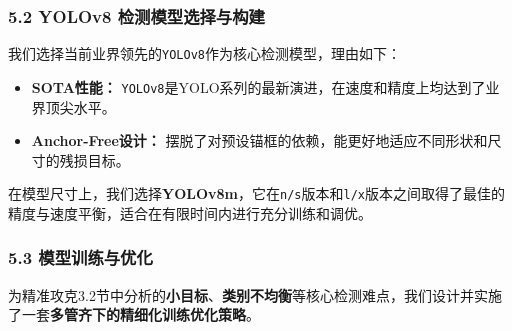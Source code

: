 \documentclass[
]{article}
\begin{document}
\subsubsection{5.2 YOLOv8
检测模型选择与构建}\label{52-yolov8-ux68c0ux6d4bux6a21ux578bux9009ux62e9ux4e0eux6784ux5efa}

我们选择当前业界领先的\texttt{YOLOv8}作为核心检测模型，理由如下：

\begin{itemize}
\item
  \textbf{SOTA性能：}
  \texttt{YOLOv8}是YOLO系列的最新演进，在速度和精度上均达到了业界顶尖水平。
\item
  \textbf{Anchor-Free设计：}
  摆脱了对预设锚框的依赖，能更好地适应不同形状和尺寸的残损目标。
\end{itemize}

在模型尺寸上，我们选择\textbf{YOLOv8m}，它在\texttt{n/s}版本和\texttt{l/x}版本之间取得了最佳的精度与速度平衡，适合在有限时间内进行充分训练和调优。

\subsubsection{\texorpdfstring{\textbf{5.3
模型训练与优化}}{5.3 模型训练与优化}}\label{53-ux6a21ux578bux8badux7ec3ux4e0eux4f18ux5316}

为精准攻克3.2节中分析的\textbf{小目标}、\textbf{类别不均衡}等核心检测难点，我们设计并实施了一套\textbf{多管齐下的精细化训练优化策略}。
\end{document}
